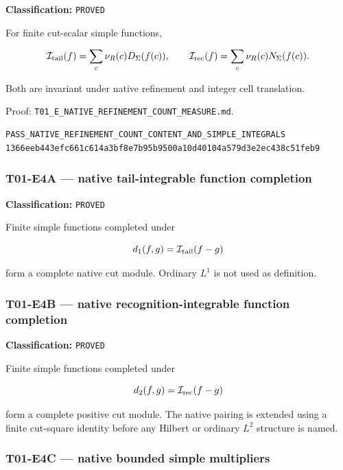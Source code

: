 \textbf{Classification:} \texttt{PROVED}

For finite cut-scalar simple functions,

\[
\mathcal I_{\rm tail}(f)
=
\sum_c\nu_R(c)D_\Sigma(f(c)),
\qquad
\mathcal I_{\rm rec}(f)
=
\sum_c\nu_R(c)N_\Sigma(f(c)).
\]

Both are invariant under native refinement and integer cell translation.

Proof:
\texttt{T01\_E\_NATIVE\_REFINEMENT\_COUNT\_MEASURE.md}.

\begin{verbatim}
PASS_NATIVE_REFINEMENT_COUNT_CONTENT_AND_SIMPLE_INTEGRALS
1366eeb443efc661c614a3bf8e7b95b9500a10d40104a579d3e2ec438c51feb9
\end{verbatim}

\hypertarget{t01-e4a-native-tail-integrable-function-completion}{%
\subsubsection{T01-E4A --- native tail-integrable function completion}\label{t01-e4a-native-tail-integrable-function-completion}}

\textbf{Classification:} \texttt{PROVED}

Finite simple functions completed under

\[
d_1(f,g)=\mathcal I_{\rm tail}(f-g)
\]

form a complete native cut module. Ordinary \(L^1\) is not used as definition.

\hypertarget{t01-e4b-native-recognition-integrable-function-completion}{%
\subsubsection{T01-E4B --- native recognition-integrable function completion}\label{t01-e4b-native-recognition-integrable-function-completion}}

\textbf{Classification:} \texttt{PROVED}

Finite simple functions completed under

\[
d_2(f,g)=\mathcal I_{\rm rec}(f-g)
\]

form a complete positive cut module. The native pairing is extended using a
finite cut-square identity before any Hilbert or ordinary \(L^2\) structure is
named.

\hypertarget{t01-e4c-native-bounded-simple-multipliers}{%
\subsubsection{T01-E4C --- native bounded simple multipliers}\label{t01-e4c-native-bounded-simple-multipliers}}

